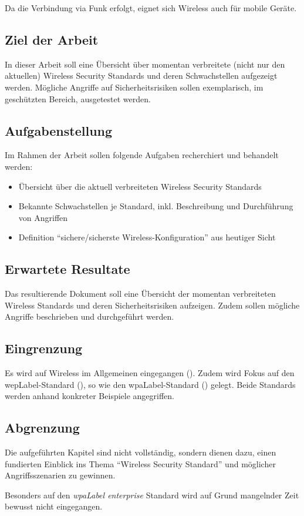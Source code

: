 Da die Verbindung via Funk erfolgt, eignet sich Wireless auch für mobile Geräte.

\subsection{Ziel der Arbeit}
In dieser Arbeit soll eine Übersicht über momentan verbreitete (nicht nur den aktuellen) Wireless Security Standards und deren Schwachstellen aufgezeigt werden.
Mögliche Angriffe auf Sicherheitsrisiken sollen exemplarisch, im geschützten Bereich, ausgetestet werden.

\subsection{Aufgabenstellung}
Im Rahmen der Arbeit sollen folgende Aufgaben recherchiert und behandelt werden:
\begin{itemize}
	\item Übersicht über die aktuell verbreiteten Wireless Security Standards
	\item Bekannte Schwachstellen je Standard, inkl. Beschreibung und Durchführung von Angriffen
	\item Definition "`sichere/sicherste Wireless-Konfiguration"' aus heutiger Sicht
\end{itemize}

\subsection{Erwartete Resultate}
Das resultierende Dokument soll eine Übersicht der momentan verbreiteten Wireless Standards und deren Sicherheitsrisiken aufzeigen.
Zudem sollen mögliche Angriffe beschrieben und durchgeführt werden.

\subsection{Eingrenzung}
Es wird auf Wireless im Allgemeinen eingegangen ().
Zudem wird Fokus auf den \gls{wepLabel}-Standard (), so wie den \gls{wpaLabel}-Standard () gelegt. Beide Standards werden anhand konkreter Beispiele angegriffen.

\subsection{Abgrenzung}
Die aufgeführten Kapitel sind nicht vollständig, sondern dienen dazu, einen fundierten Einblick ins Thema "`Wireless Security Standard"' und möglicher Angriffsszenarien zu gewinnen.

Besonders auf den \textit{\gls{wpaLabel} enterprise} Standard wird auf Grund mangelnder Zeit bewusst nicht eingegangen.
